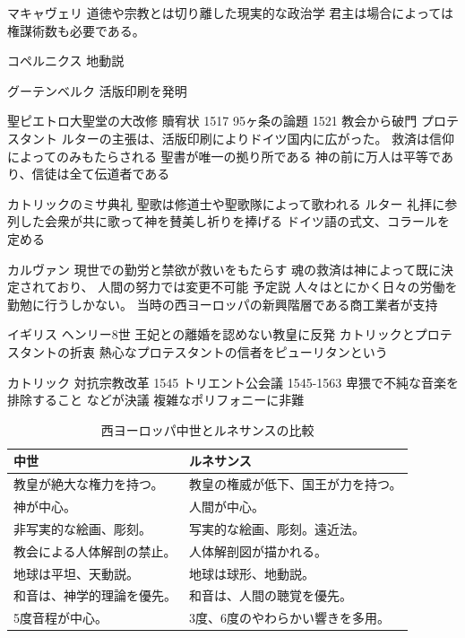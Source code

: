 \documentclass[a4j]{jarticle}
\begin{document}
マキャヴェリ
道徳や宗教とは切り離した現実的な政治学
君主は場合によっては権謀術数も必要である。

コペルニクス
地動説

グーテンベルク
活版印刷を発明

聖ピエトロ大聖堂の大改修
贖宥状
1517 95ヶ条の論題
1521 教会から破門
プロテスタント
ルターの主張は、活版印刷によりドイツ国内に広がった。
救済は信仰によってのみもたらされる
聖書が唯一の拠り所である
神の前に万人は平等であり、信徒は全て伝道者である

カトリックのミサ典礼
聖歌は修道士や聖歌隊によって歌われる
ルター
礼拝に参列した会衆が共に歌って神を賛美し祈りを捧げる
ドイツ語の式文、コラールを定める

カルヴァン
現世での勤労と禁欲が救いをもたらす
魂の救済は神によって既に決定されており、
人間の努力では変更不可能
予定説
人々はとにかく日々の労働を勤勉に行うしかない。
当時の西ヨーロッパの新興階層である商工業者が支持

イギリス
ヘンリー8世
王妃との離婚を認めない教皇に反発
カトリックとプロテスタントの折衷
熱心なプロテスタントの信者をピューリタンという

カトリック
対抗宗教改革
1545
トリエント公会議 1545-1563
卑猥で不純な音楽を排除すること
などが決議
複雑なポリフォニーに非難


\begin{table}[tb]
 \begin{center}
  \caption{西ヨーロッパ中世とルネサンスの比較}
  \label{tab:comparison}
  \begin{tabular}{|l|l|} \hline
  中世                       & ルネサンス                         \\
  \hline \hline
  教皇が絶大な権力を持つ。   & 教皇の権威が低下、国王が力を持つ。 \\ \hline
  神が中心。                 & 人間が中心。                       \\ \hline
  非写実的な絵画、彫刻。     & 写実的な絵画、彫刻。遠近法。       \\ \hline
  教会による人体解剖の禁止。 & 人体解剖図が描かれる。             \\ \hline
  地球は平坦、天動説。       & 地球は球形、地動説。               \\ \hline
  和音は、神学的理論を優先。 & 和音は、人間の聴覚を優先。         \\
  5度音程が中心。            & 3度、6度のやわらかい響きを多用。   \\ \hline
  \end{tabular}
 \end{center}
\end{table}
\end{document}
